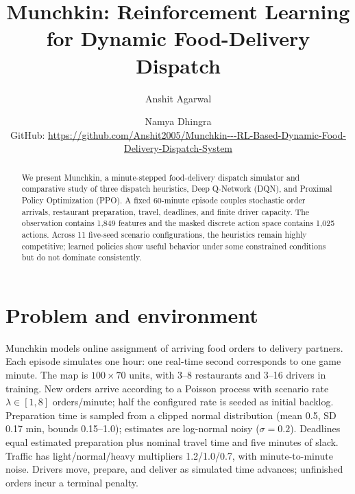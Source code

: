 \documentclass[9pt,twocolumn]{article}
\title{Munchkin: Reinforcement Learning for Dynamic Food-Delivery Dispatch}
\author{Anshit Agarwal \and Namya Dhingra\\\small GitHub: \url{https://github.com/Anshit2005/Munchkin---RL-Based-Dynamic-Food-Delivery-Dispatch-System}}
\date{}
\begin{document}
\maketitle\begin{abstract}
We present Munchkin, a minute-stepped food-delivery dispatch simulator and comparative study of three dispatch heuristics, Deep Q-Network (DQN), and Proximal Policy Optimization (PPO). A fixed 60-minute episode couples stochastic order arrivals, restaurant preparation, travel, deadlines, and finite driver capacity. The observation contains 1,849 features and the masked discrete action space contains 1,025 actions. Across 11 five-seed scenario configurations, the heuristics remain highly competitive; learned policies show useful behavior under some constrained conditions but do not dominate consistently.\end{abstract}
\section{Problem and environment}
Munchkin models online assignment of arriving food orders to delivery partners. Each episode simulates one hour: one real-time second corresponds to one game minute. The map is $100\times70$ units, with 3--8 restaurants and 3--16 drivers in training. New orders arrive according to a Poisson process with scenario rate $\lambda\in[1,8]$ orders/minute; half the configured rate is seeded as initial backlog. Preparation time is sampled from a clipped normal distribution (mean 0.5, SD 0.17 min, bounds 0.15--1.0); estimates are log-normal noisy ($\sigma=0.2$). Deadlines equal estimated preparation plus nominal travel time and five minutes of slack. Traffic has light/normal/heavy multipliers 1.2/1.0/0.7, with minute-to-minute noise. Drivers move, prepare, and deliver as simulated time advances; unfinished orders incur a terminal penalty.
\end{document}

